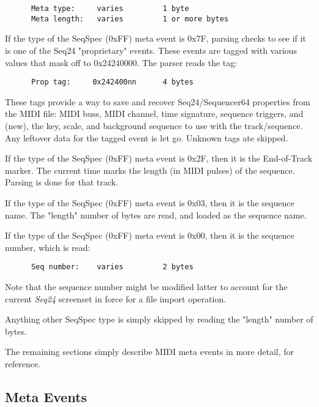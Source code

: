    \begin{verbatim}
      Meta type:     varies         1 byte
      Meta length:   varies         1 or more bytes
   \end{verbatim}

   If the type of the SeqSpec (0xFF) meta event is 0x7F, parsing checks to see
   if it is one of the Seq24 "proprietary" events.  These events are tagged
   with various values that mask off to 0x24240000.  The parser reads the
   tag:

   \begin{verbatim}
      Prop tag:     0x242400nn      4 bytes
   \end{verbatim}

   These tags provide a way to save and recover Seq24/Sequencer64 properties
   from the MIDI file: MIDI buss, MIDI channel, time signature, sequence
   triggers, and (new), the key, scale, and background sequence to use with the
   track/sequence.  Any leftover data for the tagged event is let go.  Unknown
   tags ate skipped.

   If the type of the SeqSpec (0xFF) meta event is 0x2F, then it is the
   End-of-Track marker.  The current time marks the length (in MIDI pulses) of
   the sequence.  Parsing is done for that track.

   If the type of the SeqSpec (0xFF) meta event is 0x03, then it is the
   sequence name.  The "length" number of bytes are read, and loaded as the
   sequence name.

   If the type of the SeqSpec (0xFF) meta event is 0x00, then it is the
   sequence number, which is read:

   \begin{verbatim}
      Seq number:    varies         2 bytes
   \end{verbatim}

   Note that the sequence number might be modified latter to account for the
   current \textsl{Seq24} screenset in force for a file import operation.

   Anything other SeqSpec type is simply skipped by reading the "length" number
   of bytes.

   The remaining sections simply describe MIDI meta events in more detail, for
   reference.

\subsection{Meta Events}
\label{subsubsec:midi_format_meta_events_summary}

